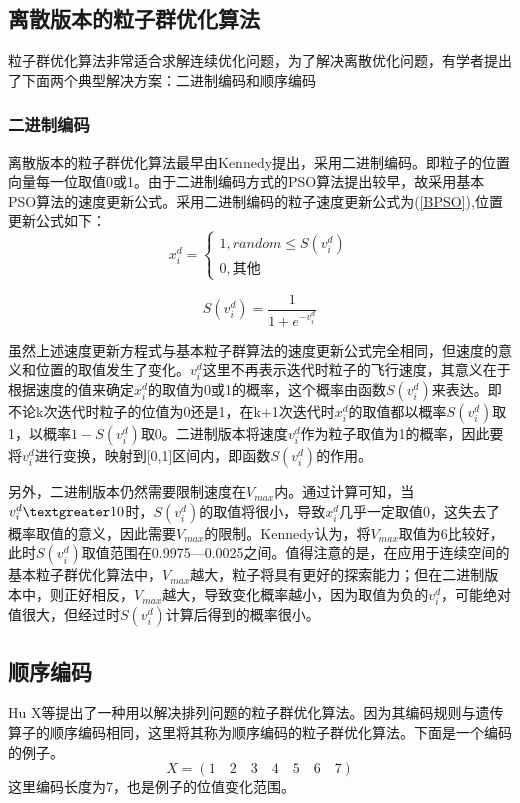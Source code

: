 \subsection{离散版本的粒子群优化算法}
粒子群优化算法非常适合求解连续优化问题，为了解决离散优化问题，有学者提出了下面两个典型解决方案：二进制编码和顺序编码

\subsubsection{二进制编码}
离散版本的粒子群优化算法最早由Kennedy提出，采用二进制编码。即粒子的位置向量每一位取值0或1。由于二进制编码方式的PSO算法提出较早，故采用基本PSO算法的速度更新公式。采用二进制编码的粒子速度更新公式为(\ref{BPSO}),位置更新公式如下：
\begin{equation}
x_i^d=
\left\{
\begin{array}{ll}
1,random\le S(v_i^d)\\
0,\mbox{其他}
\end{array}
\right.
\end{equation}

\begin{equation}
S(v_i^d)=\frac{1}{1+e^{-v_i^d}}
\end{equation}

虽然上述速度更新方程式与基本粒子群算法的速度更新公式完全相同，但速度的意义和位置的取值发生了变化。$v_i^d$这里不再表示迭代时粒子的飞行速度，其意义在于根据速度的值来确定$x_i^d$的取值为0或1的概率，这个概率由函数$S(v_i^d)$来表达。即不论k次迭代时粒子的位值为0还是1，在k+1次迭代时$x_i^d$的取值都以概率$S(v_i^d)$取1，以概率$1-S(v_i^d)$取0。二进制版本将速度$v_i^d$作为粒子取值为1的概率，因此要将$v_i^d$进行变换，映射到[0,1]区间内，即函数$S(v_i^d)$的作用。

另外，二进制版本仍然需要限制速度在$V_{max}$内。通过计算可知，当$v_i^d\textgreater 10$时，$S(v_i^d)$的取值将很小，导致$x_i^d$几乎一定取值0，这失去了概率取值的意义，因此需要$V_{max}$的限制。Kennedy认为，将$V_{max}$取值为6比较好，此时$S(v_i^d)$取值范围在0.9975—0.0025之间。值得注意的是，在应用于连续空间的基本粒子群优化算法中，$V_{max}$越大，粒子将具有更好的探索能力；但在二进制版本中，则正好相反，$V_{max}$越大，导致变化概率越小，因为取值为负的$v_i^d$，可能绝对值很大，但经过时$S(v_i^d)$计算后得到的概率很小。

\subsection{顺序编码}
Hu X等提出了一种用以解决排列问题的粒子群优化算法。因为其编码规则与遗传算子的顺序编码相同，这里将其称为顺序编码的粒子群优化算法。下面是一个编码的例子。$$X=(1\quad2\quad3\quad4\quad5\quad6\quad7)$$这里编码长度为7，也是例子的位值变化范围。

